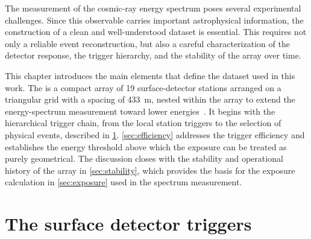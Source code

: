 \documentclass[main.tex]{subfiles}
\begin{document}


The measurement of the cosmic-ray energy spectrum poses several experimental challenges.
Since this observable carries important astrophysical information, the construction of a clean and well-understood dataset is essential.
This requires not only a reliable event reconstruction, but also a careful characterization of the detector response, the trigger hierarchy, and the stability of the array over time.

This chapter introduces the main elements that define the dataset used in this work.
The  is a compact array of 19 surface-detector stations arranged on a triangular grid with a spacing of \SI{433}{\m}, nested within the  array to extend the energy-spectrum measurement toward lower energies~\cite{BrichettoOrquera:2023}.
It begins with the hierarchical trigger chain, from the local station triggers to the selection of physical events, described in \cref{sec:triggers}.
\cref{sec:efficiency} addresses the trigger efficiency and establishes the energy threshold above which the exposure can be treated as purely geometrical.
The discussion closes with the stability and operational history of the array in \cref{sec:stability}, which provides the basis for the exposure calculation in \cref{sec:exposure} used in the spectrum measurement.

\section{The surface detector triggers}
\label{sec:triggers}
\end{document}
